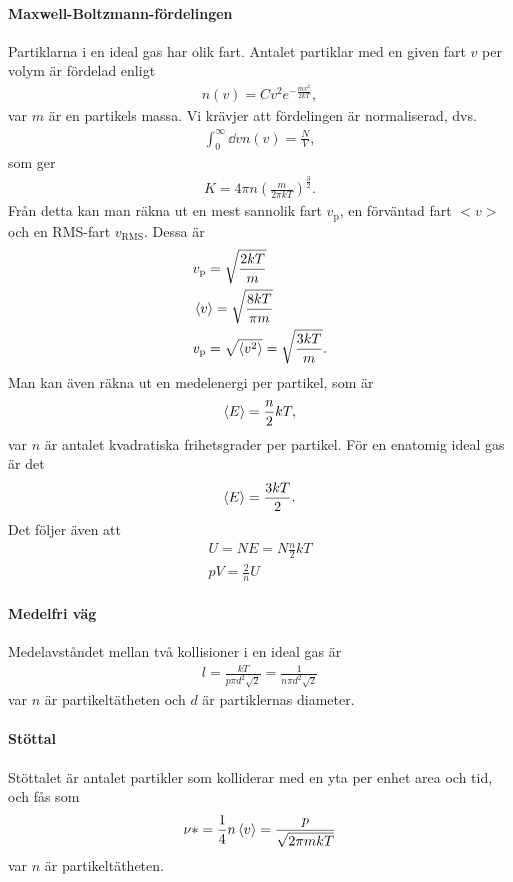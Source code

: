 \paragraph{Maxwell-Boltzmann-fördelingen}
Partiklarna i en ideal gas har olik fart. Antalet partiklar med en given fart $v$ per volym är fördelad enligt
\begin{align*}
	n(v) = Cv^2e^{-\frac{mv^2}{2kT}},
\end{align*}
var $m$ är en partikels massa. Vi krävjer att fördelingen är normaliserad, dvs.
\begin{align*}
	\int_0^{\infty}\dd{v}n(v) = \frac{N}{V},
\end{align*}
som ger
\begin{align*}
	K = 4\pi n \left(\frac{m}{2\pi kT}\right)^\frac{3}{2}.
\end{align*}
Från detta kan man räkna ut en mest sannolik fart $v_\text{p}$, en förväntad fart $<v>$ och en RMS-fart $v_\text{RMS}$. Dessa är
\begin{align*}
	& v_\text{p} = \sqrt{\frac{2kT}{m}}\\
	& \expval{v} = \sqrt{\frac{8kT}{\pi m}}\\
	& v_\text{p} = \sqrt{\expval{v^2}} = \sqrt{\frac{3kT}{m}}.
\end{align*}
Man kan även räkna ut en medelenergi per partikel, som är
\begin{align*}
	\expval{E} = \frac{n}{2}kT,
\end{align*}
var $n$ är antalet kvadratiska frihetsgrader per partikel. För en enatomig ideal gas är det
\begin{align*}
	\expval{E} = \frac{3kT}{2}.
\end{align*}
Det följer även att
\begin{align*}
	U = NE = N\frac{n}{2}kT\\
	pV = \frac{2}{n}U
\end{align*}

\paragraph{Medelfri väg}
Medelavståndet mellan två kollisioner i en ideal gas är
\begin{align*}
	l = \frac{kT}{p\pi d^2\sqrt{2}} = \frac{1}{n\pi d^2\sqrt{2}}
\end{align*}
var $n$ är partikeltätheten och $d$ är partiklernas diameter.

\paragraph{Stöttal}
Stöttalet är antalet partikler som kolliderar med en yta per enhet area och tid, och fås som
\begin{align*}
	\nu * = \frac{1}{4}n\expval{v} = \frac{p}{\sqrt{2\pi mkT}}
\end{align*}
var $n$ är partikeltätheten.